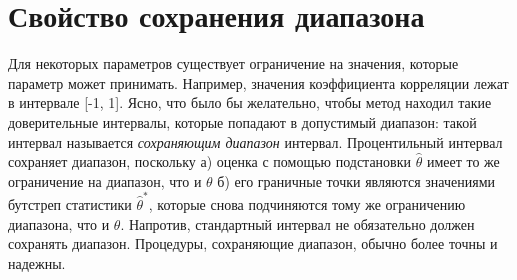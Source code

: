 \section{Свойство сохранения диапазона}
Для некоторых параметров существует ограничение на значения, которые 
параметр может принимать. Например, значения коэффициента корреляции 
лежат в интервале [-1, 1]. Ясно, что было бы желательно, чтобы метод 
находил такие доверительные интервалы, которые попадают в допустимый диапазон: 
такой интервал называется \textit{сохраняющим диапазон} интервал. 
Процентильный интервал сохраняет диапазон, поскольку а) оценка с помощью 
подстановки $\widehat{\theta}$ имеет то же ограничение на диапазон, что и 
$\theta$ б) его граничные точки являются значениями бутстреп статистики 
$\widehat{\theta}^{*}$, которые снова подчиняются тому же ограничению диапазона, 
что и $\theta$. Напротив, стандартный интервал не обязательно должен сохранять 
диапазон. Процедуры, сохраняющие диапазон, обычно более точны и надежны.

